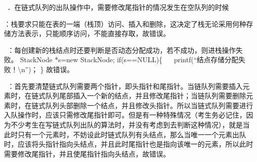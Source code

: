 ~．在链式队列的出队操作中，需要修改尾指针的情况发生在空队列的时候
\par{}
\begin{solution}：栈要求只能在表的一端（栈顶）访问、插入和删除，这决定了栈无论采用何种存储方法表示，只能顺序访问，不能直接存取，故错误。

~：每创建新的栈结点时还要判断是否动态分配成功，若不成功，则进栈操作失败。
StackNode *s=new StackNode; if(s==NULL)\{ ~
~printf(``结点存储分配失败！\textbackslash{}n'')； \} 故错误。

~：首先要清楚链式队列需要两个指针，即头指针和尾指针。当链队列需要插入元素时，在链式队列尾部插入一个新的结点，并且修改尾指针；当链队列需要删除元素时，在链式队列头部删除一个结点，并且修改头指针。所以当链式队列需要进行入队操作时，应该只需修改尾指针即可。但是有一种特殊情况（考生务必记住，因为不少考生在写链式队列出队的算法时，并没有考虑到去判断这种情况），就是当此时只有一个元素时，不妨设此时链式队列有头结点，那么当唯一一个元素出队时，应该将头指针指向头结点，并且此时尾指针也是指向该唯一的元素，所以此时需要修改尾指针，并且使尾指针指向头结点，故错误。
\end{solution}
